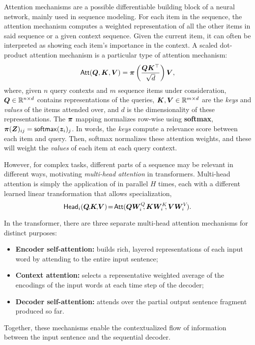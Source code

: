 \begin{definition}
    Attention mechanisms are a possible differentiable building block
    of a neural network, mainly used in sequence modeling. For each
    item in the sequence, the attention mechanism computes a weighted
    representation of all the other items in said sequence or a given
    context sequence. Given the current item, it can often be
    interpreted as showing each item's importance in the context. A
    scaled dot-product attention mechanism is a particular type of
    attention mechanism:
    \begin{equation}
        \operatorname{\mathsf{Att}}(\bm{Q}, \bm{K}, \bm{V}) = \bm{\pi}
        \left(\frac{\bm{Q}\bm{K}^\top}{\sqrt{d}}\right) \bm{V},
        \label{eq:att_scaled_dot}
    \end{equation}
    where, given $n$ query contexts and $m$ sequence items under
    consideration, $\bm{Q} \in \mathbb{R}^{n \times d}$ contains
    representations of the queries, $\bm{K}, \bm{V} \in \mathbb{R}^{m
            \times d}$ are the \emph{keys} and \emph{values} of the items
    attended over, and $d$ is the dimensionality of these
    representations. The $\bm{\pi}$ mapping normalizes row-wise using
    \textbf{softmax}, $\bm{\pi}(\bm{Z})_{ij} = \operatorname*{\mathsf{softmax}}(\bm{z}_i)_j$.
    In words, the \emph{keys} compute a relevance score between each item
    and query. Then, softmax normalizes these attention weights, and
    these will weight the \emph{values} of each item at each query
    context.
\end{definition}

However, for complex tasks, different parts of a sequence may be
relevant in different ways, motivating \emph{multi-head attention} in
transformers. Multi-head attention is simply the application of
 in parallel $H$ times, each with a
different learned linear transformation that allows specialization,
%
\begin{equation}\label{eq:head}%
    \ath_i(\bm{Q}\!,\!\bm{K}\!,\!\bm{V})\!=\!\att(\bm{QW}_i^Q\!\!,\bm{KW}_i^K\!\!,\bm{VW}_i^V\!).
\end{equation}

In the transformer, there are three separate multi-head attention mechanisms for
distinct purposes:
%
\begin{itemize}
    \item \textbf{Encoder self-attention:} builds rich, layered representations of
          each input word by attending to the entire input sentence;
    \item \textbf{Context attention:} selects
          a representative weighted average of the encodings of the input words at each
          time step of the decoder;
    \item \textbf{Decoder self-attention:} attends over the partial output sentence
          fragment produced so far.
\end{itemize}
%
Together, these mechanisms enable the contextualized flow of information between
the input sentence and the sequential decoder.

